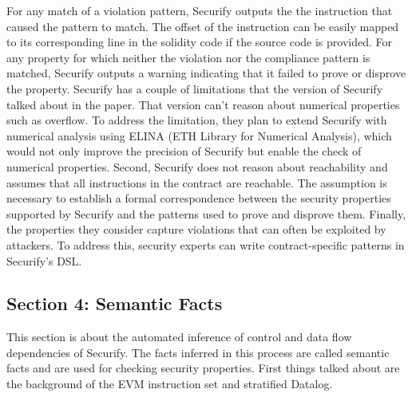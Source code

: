\documentclass{article}
\begin{document}
For any match of a violation pattern, Securify outputs the the instruction that caused the pattern to match. The offset of the instruction can be easily mapped to its corresponding line in the solidity code if the source code is provided. For any property for which neither the violation nor the compliance pattern is matched, Securify outputs a warning indicating that it failed to prove or disprove the property. Securify has a couple of limitations that the version of Securify talked about in the paper. That version can't reason about numerical properties such as overflow. To address the limitation, they plan to extend Securify with numerical analysis using ELINA (ETH Library for Numerical Analysis), which would not only improve the precision of Securify but enable the check of numerical properties. Second, Securify does not reason about reachability and assumes that all instructions in the contract are reachable. The assumption is necessary to establish a formal correspondence between the security properties supported by Securify and the patterns used to prove and disprove them. Finally, the properties they consider capture violations that can often be exploited by attackers. To address this, security experts can write contract-specific patterns in Securify's DSL.

\subsection{Section 4: Semantic Facts}

This section is about the automated inference of control and data flow dependencies of Securify. The facts inferred in this process are called semantic facts and are used for checking security properties. First things talked about are the background of the EVM instruction set and stratified Datalog.
\end{document}
